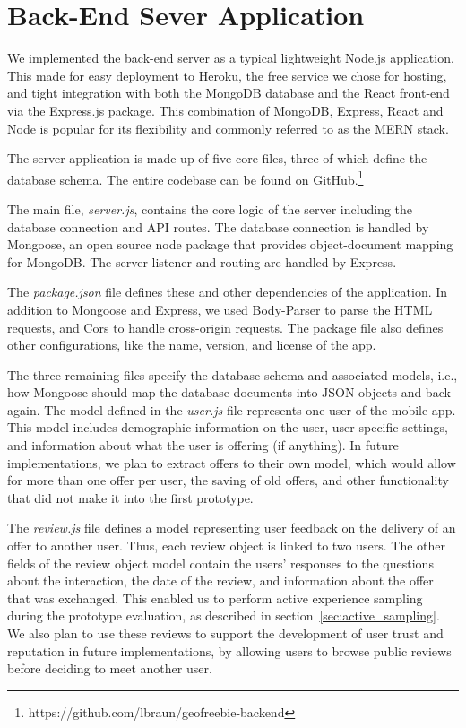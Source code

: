 \section{Back-End Sever Application}
\label{sec:backend_architecture}

We implemented the back-end server as a typical lightweight Node.js application. This made for easy deployment to Heroku, the free service we chose for hosting, and tight integration with both the MongoDB database and the React front-end via the Express.js package. This combination of MongoDB, Express, React and Node is popular for its flexibility and commonly referred to as the MERN stack.

The server application is made up of five core files, three of which define the database schema. The entire codebase can be found on GitHub.\footnote{https://github.com/lbraun/geofreebie-backend}

The main file, \textit{server.js}, contains the core logic of the server including the database connection and API routes. The database connection is handled by Mongoose, an open source node package that provides object-document mapping for MongoDB. The server listener and routing are handled by Express.

The \textit{package.json} file defines these and other dependencies of the application. In addition to Mongoose and Express, we used Body-Parser to parse the HTML requests, and Cors to handle cross-origin requests. The package file also defines other configurations, like the name, version, and license of the app.

The three remaining files specify the database schema and associated models, i.e., how Mongoose should map the database documents into JSON objects and back again. The model defined in the \textit{user.js} file represents one user of the mobile app. This model includes demographic information on the user, user-specific settings, and information about what the user is offering (if anything). In future implementations, we plan to extract offers to their own model, which would allow for more than one offer per user, the saving of old offers, and other functionality that did not make it into the first prototype.

The \textit{review.js} file defines a model representing user feedback on the delivery of an offer to another user. Thus, each review object is linked to two users. The other fields of the review object model contain the users' responses to the questions about the interaction, the date of the review, and information about the offer that was exchanged. This enabled us to perform active experience sampling during the prototype evaluation, as described in section~\ref{sec:active_sampling}. We also plan to use these reviews to support the development of user trust and reputation in future implementations, by allowing users to browse public reviews before deciding to meet another user.

